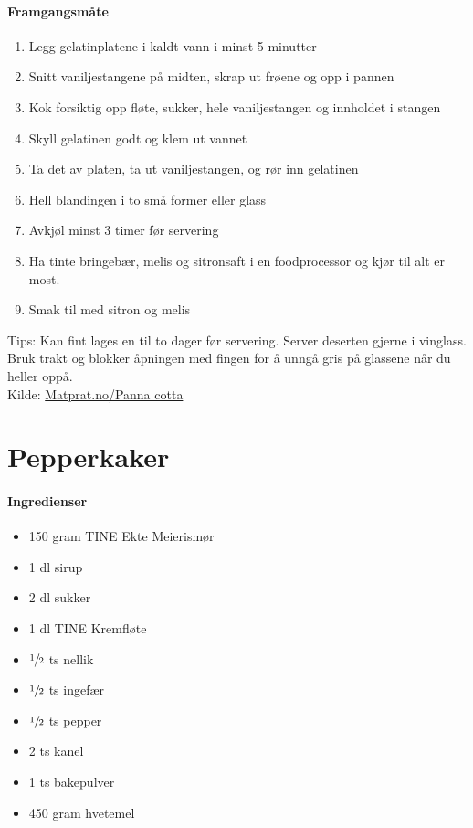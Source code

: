 \documentclass[12pt,a4paper]{book}
\begin{document}
\paragraph{Framgangsmåte}
\begin{enumerate}[noitemsep]
	\item Legg gelatinplatene i kaldt vann i minst 5 minutter
	\item Snitt vaniljestangene på midten, skrap ut frøene og opp i pannen
	\item Kok forsiktig opp fløte, sukker, hele vaniljestangen og innholdet i stangen
	\item Skyll gelatinen godt og klem ut vannet
	\item Ta det av platen, ta ut vaniljestangen, og rør inn gelatinen
	\item Hell blandingen i to små former eller glass
	\item Avkjøl minst 3 timer før servering
	\item Ha tinte bringebær, melis og sitronsaft i en foodprocessor og kjør til alt er most.
	\item Smak til med sitron og melis
\end{enumerate}


Tips: Kan fint lages en til to dager før servering. Server deserten gjerne i vinglass. Bruk trakt og blokker åpningen med fingen for å unngå gris på glassene når du heller oppå.\\

Kilde: \href{http://www.matprat.no/gjester/gjesteoppskrifter/panna-cotta/}{Matprat.no/Panna cotta}
\clearpage{}
\clearpage{}\section{﻿Pepperkaker}


\paragraph{Ingredienser}
\begin{itemize}[noitemsep]
	\item 150 gram TINE Ekte Meierismør
	\item 1 dl sirup
	\item 2 dl sukker
	\item 1 dl TINE Kremfløte
	\item $\sfrac{1}{2}$ ts nellik
	\item $\sfrac{1}{2}$ ts ingefær
	\item $\sfrac{1}{2}$ ts pepper
	\item 2 ts kanel
	\item 1 ts bakepulver
	\item 450 gram hvetemel
\end{itemize}
\end{document}
